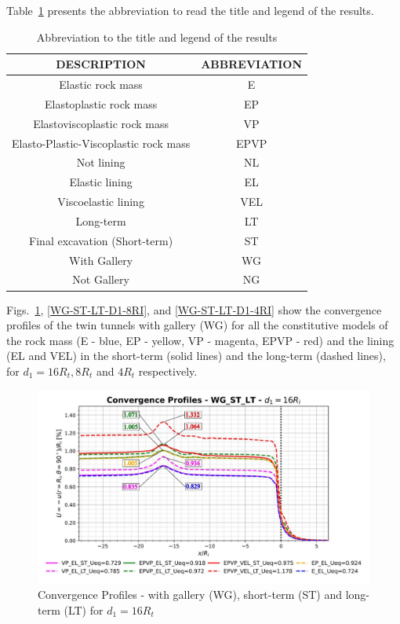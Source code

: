 \documentclass[a4paper,fleqn]{cas-sc}
\begin{document}
\FloatBarrier
Table~\ref{table3} presents the abbreviation to read the title and legend of the results.
\begin{table}
	\caption{Abbreviation to the title and legend of the results}
	\label{table3}
	\centering
	\renewcommand{\arraystretch}{1.25}
	\begin{tabular}{c c}
		\hline
		\multicolumn{1}{c}{DESCRIPTION} &
		\multicolumn{1}{c}{ABBREVIATION} \\
		\hline
		Elastic rock mass & E \\
		Elastoplastic rock mass & EP \\
		Elastoviscoplastic rock mass & VP \\
		Elasto-Plastic-Viscoplastic rock mass & EPVP \\
		Not lining & NL \\
		Elastic lining & EL \\
		Viscoelastic lining & VEL \\
		Long-term & LT \\
		Final excavation (Short-term) & ST \\
		With Gallery & WG \\
		Not Gallery & NG \\			
		\hline
	\end{tabular}
	\normalsize
\end{table}
\FloatBarrier
Figs.~\ref{WG-ST-LT-D1-16RI}, \ref{WG-ST-LT-D1-8RI}, and \ref{WG-ST-LT-D1-4RI} show the convergence profiles of the twin tunnels with gallery (WG) for all the constitutive models of the rock mass (E - blue, EP - yellow, VP - magenta, EPVP - red) and the lining (EL and VEL) in the short-term (solid lines) and the long-term (dashed lines), for $d_1 = 16R_t, 8R_t$ and $4R_t$ respectively.
\begin{figure}[h!]
	\centering
	\includegraphics[scale=0.5]{Convergence Profiles - WG_ST_LT - $d_1=16R_i$.pdf}
	\caption{Convergence Profiles - with gallery (WG), short-term (ST) and long-term (LT) for $d_1 = 16R_t$}
	\label{WG-ST-LT-D1-16RI}
\end{figure}
\end{document}
